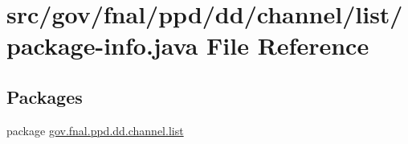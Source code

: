 \hypertarget{dd_2channel_2list_2package-info_8java}{\section{src/gov/fnal/ppd/dd/channel/list/package-\/info.java File Reference}
\label{dd_2channel_2list_2package-info_8java}
}
\subsection*{Packages}
\begin{DoxyCompactItemize}
\item 
package \hyperlink{namespacegov_1_1fnal_1_1ppd_1_1dd_1_1channel_1_1list}{gov.\-fnal.\-ppd.\-dd.\-channel.\-list}
\end{DoxyCompactItemize}
